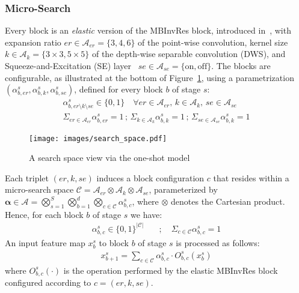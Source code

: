 \documentclass[dvipsnames,table,xcdraw]{article}
\newcommand{\balpha}{\bm{\alpha}}
\begin{document}
\subsubsection{Micro-Search}\label{sec:micro_search}
Every block is an \textit{elastic} version of the MBInvRes block, introduced in~\cite{mobilenetv2}, with expansion ratio $er\in\mathcal{A}_{er}=\{3,4,6\}$ of the point-wise convolution, kernel size $k\in\mathcal{A}_{k}=\{3\times3, 5\times5\}$ of the depth-wise separable convolution (DWS), and Squeeze-and-Excitation (SE) layer~\cite{SE} $se\in\mathcal{A}_{se}=\{\text{on}, \text{off}\}$.
The blocks are configurable, as illustrated at the bottom of Figure~\ref{fig:super_net}, using a parametrization $(\alpha^s_{b,er}, \alpha^s_{b,k}, \alpha^s_{b,se})$, defined for every block $b$ of stage $s$:
\begin{align*}
    \alpha^s_{b,er\setminus k \setminus se}\in \{0, 1\}  \quad \forall er\in\mathcal{A}_{er},\, k \in \mathcal{A}_{k},\, se\in \mathcal{A}_{se}
    \\
    \Sigma_{er \in \mathcal{A}_{er}} \alpha^s_{b,er} = 1
    \, ; \,
    \Sigma_{k \in \mathcal{A}_{k}} \alpha^s_{b,k} = 1
    \,; \,
    \Sigma_{se \in \mathcal{A}_{se}} \alpha^s_{b,k} = 1
\end{align*}
\begin{figure}[t]
  \centering
  \texttt{[image: images/search\_space.pdf]}
\caption{A search space view via the one-shot model}
\label{fig:super_net}
\end{figure}
Each triplet $(er, k, se)$ induces a block configuration $c$ that resides within a micro-search space $\mathcal{C}=\mathcal{A}_{er}\otimes\mathcal{A}_{k}\otimes\mathcal{A}_{se}$, parameterized by  $\balpha\!\in\!\mathcal{A}=\bigotimes_{s=1}^S\bigotimes_{b=1}^d\bigotimes_{c\in\mathcal{C}}\alpha^s_{b,c}$, where $\otimes$ denotes the Cartesian product. Hence, for each block $b$ of stage $s$ we have:
\begin{align*}
    \alpha^s_{b,c}\in \{0, 1\}^{\left|\mathcal{C}\right|} \quad &; \quad 
    \Sigma_{c\in\mathcal{C}} \alpha^s_{b,c} = 1
\end{align*}
An input feature map $x^s_b$ to block $b$ of stage $s$ is processed as follows:
\begin{align*}
    x^s_{b+1}=\sum_{c\in\mathcal{C}}\alpha^s_{b,c}\cdot O^s_{b,c}(x^s_b) 
\end{align*}
where $O^s_{b,c}(\cdot)$ is the operation performed by the elastic MBInvRes block configured according to $c=(er,k,se)$.
\end{document}
